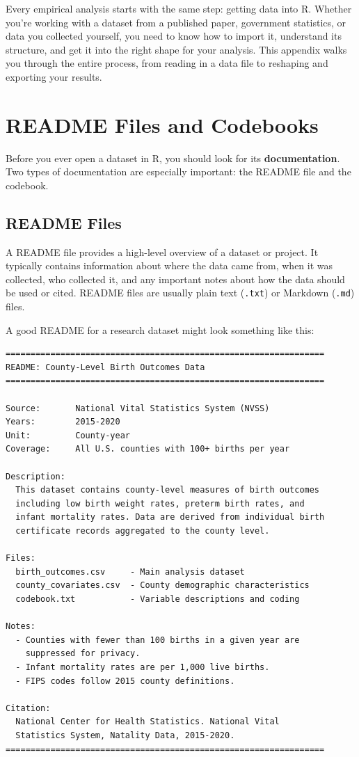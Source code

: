 \documentclass[
  letterpaper,
  DIV=11,
  numbers=noendperiod]{scrreprt}
\begin{document}
Every empirical analysis starts with the same step: getting data into R.
Whether you're working with a dataset from a published paper, government
statistics, or data you collected yourself, you need to know how to
import it, understand its structure, and get it into the right shape for
your analysis. This appendix walks you through the entire process, from
reading in a data file to reshaping and exporting your results.

\section{README Files and Codebooks}\label{readme-files-and-codebooks}

Before you ever open a dataset in R, you should look for its
\textbf{documentation}. Two types of documentation are especially
important: the README file and the codebook.

\subsection{README Files}\label{readme-files}

A README file provides a high-level overview of a dataset or project. It
typically contains information about where the data came from, when it
was collected, who collected it, and any important notes about how the
data should be used or cited. README files are usually plain text
(\texttt{.txt}) or Markdown (\texttt{.md}) files.

A good README for a research dataset might look something like this:

\begin{verbatim}
================================================================
README: County-Level Birth Outcomes Data
================================================================

Source:       National Vital Statistics System (NVSS)
Years:        2015-2020
Unit:         County-year
Coverage:     All U.S. counties with 100+ births per year

Description:
  This dataset contains county-level measures of birth outcomes
  including low birth weight rates, preterm birth rates, and
  infant mortality rates. Data are derived from individual birth
  certificate records aggregated to the county level.

Files:
  birth_outcomes.csv     - Main analysis dataset
  county_covariates.csv  - County demographic characteristics
  codebook.txt           - Variable descriptions and coding

Notes:
  - Counties with fewer than 100 births in a given year are
    suppressed for privacy.
  - Infant mortality rates are per 1,000 live births.
  - FIPS codes follow 2015 county definitions.

Citation:
  National Center for Health Statistics. National Vital
  Statistics System, Natality Data, 2015-2020.
================================================================
\end{verbatim}
\end{document}
